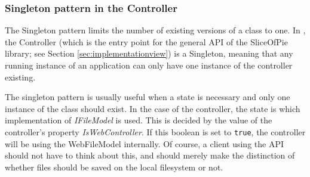 \subsubsection{Singleton pattern in the Controller}

The Singleton pattern limits the number of existing versions of a class to one. In \SOP{},
the Controller (which is the entry point for the general API of the SliceOfPie library; see
Section \ref{sec:implementationview}) is a Singleton, meaning that any running instance of
an application can only have one instance of the controller existing.

The singleton pattern is usually useful when a state is necessary and only one instance of the
class should exist. In the case of the controller, the state is which implementation of \emph{IFileModel} is used.
This is decided by the value of the controller's property \emph{IsWebController}. If this boolean
is set to \verb|true|, the controller will be using the WebFileModel internally. Of course, a
client using the API should not have to think about this, and should merely make the distinction
of whether files should be saved on the local filesystem or not.
